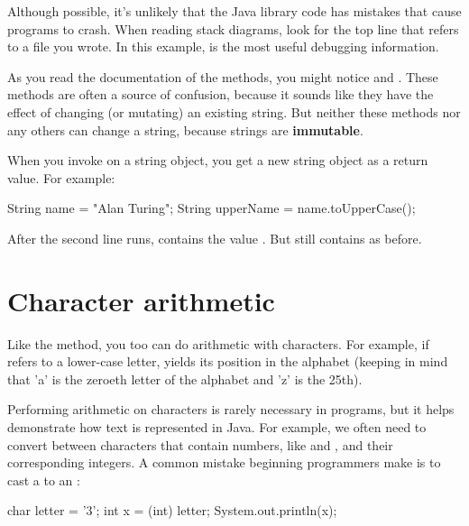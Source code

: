 Although possible, it's unlikely that the Java library code has mistakes that cause programs to crash.
When reading stack diagrams, look for the top line that refers to a file you wrote.
In this example,  is the most useful debugging information.

\label{immutable}


As you read the documentation of the  methods, you might notice  and .
These methods are often a source of confusion, because it sounds like they have the effect of changing (or mutating) an existing string.
But neither these methods nor any others can change a string, because strings are {\bf immutable}.

When you invoke  on a string object, you get a new string object as a return value.
For example:

\begin{code}
    String name = "Alan Turing";
    String upperName = name.toUpperCase();
\end{code}


After the second line runs,  contains the value .
But  still contains  as before.


\section{Character arithmetic}

Like the  method, you too can do arithmetic with characters.
For example, if  refers to a lower-case letter,  yields its position in the alphabet (keeping in mind that 'a' is the zeroeth letter of the alphabet and 'z' is the 25th).

Performing arithmetic on characters is rarely necessary in programs, but it helps demonstrate how text is represented in Java.
For example, we often need to convert between characters that contain numbers, like  and , and their corresponding integers.
A common mistake beginning programmers make is to cast a  to an :

\begin{code}
    char letter = '3';
    int x = (int) letter;
    System.out.println(x);
\end{code}

